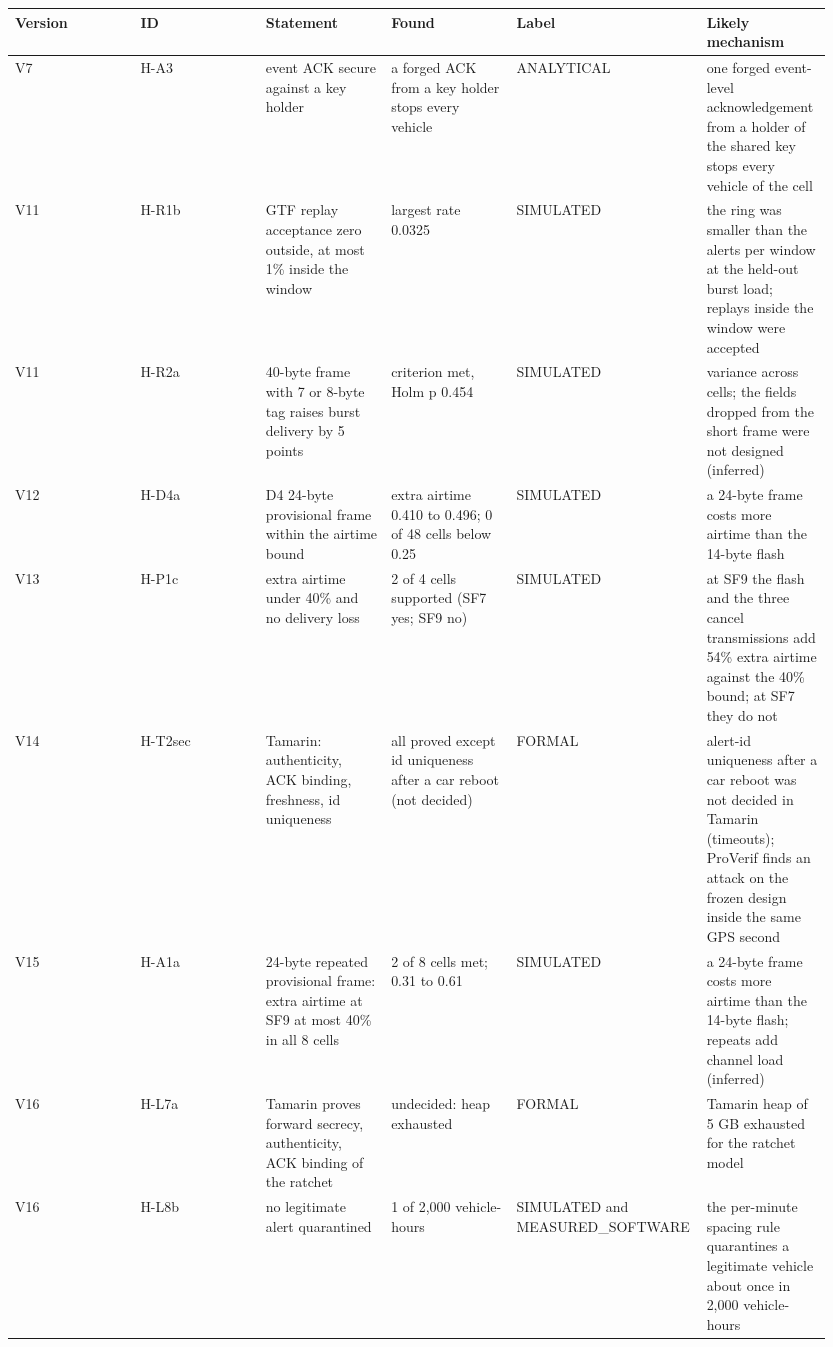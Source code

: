 {\scriptsize\raggedright
\begin{longtable}{p{0.158\linewidth}p{0.158\linewidth}p{0.158\linewidth}p{0.158\linewidth}p{0.158\linewidth}p{0.158\linewidth}}
\toprule
Version & ID & Statement & Found & Label & Likely mechanism \\
\midrule
\endhead
V7 & H-A3 & event ACK secure against a key holder & a forged ACK from a key holder stops every vehicle & ANALYTICAL & one forged event-level acknowledgement from a holder of the shared key stops every vehicle of the cell \\
V11 & H-R1b & GTF replay acceptance zero outside, at most 1\% inside the window & largest rate 0.0325 & SIMULATED & the ring was smaller than the alerts per window at the held-out burst load; replays inside the window were accepted \\
V11 & H-R2a & 40-byte frame with 7 or 8-byte tag raises burst delivery by 5 points & criterion met, Holm p 0.454 & SIMULATED & variance across cells; the fields dropped from the short frame were not designed (inferred) \\
V12 & H-D4a & D4 24-byte provisional frame within the airtime bound & extra airtime 0.410 to 0.496; 0 of 48 cells below 0.25 & SIMULATED & a 24-byte frame costs more airtime than the 14-byte flash \\
V13 & H-P1c & extra airtime under 40\% and no delivery loss & 2 of 4 cells supported (SF7 yes; SF9 no) & SIMULATED & at SF9 the flash and the three cancel transmissions add 54\% extra airtime against the 40\% bound; at SF7 they do not \\
V14 & H-T2sec & Tamarin: authenticity, ACK binding, freshness, id uniqueness & all proved except id uniqueness after a car reboot (not decided) & FORMAL & alert-id uniqueness after a car reboot was not decided in Tamarin (timeouts); ProVerif finds an attack on the frozen design inside the same GPS second \\
V15 & H-A1a & 24-byte repeated provisional frame: extra airtime at SF9 at most 40\% in all 8 cells & 2 of 8 cells met; 0.31 to 0.61 & SIMULATED & a 24-byte frame costs more airtime than the 14-byte flash; repeats add channel load (inferred) \\
V16 & H-L7a & Tamarin proves forward secrecy, authenticity, ACK binding of the ratchet & undecided: heap exhausted & FORMAL & Tamarin heap of 5 GB exhausted for the ratchet model \\
V16 & H-L8b & no legitimate alert quarantined & 1 of 2,000 vehicle-hours & SIMULATED and MEASURED\_SOFTWARE & the per-minute spacing rule quarantines a legitimate vehicle about once in 2,000 vehicle-hours \\
\bottomrule
\end{longtable}}

